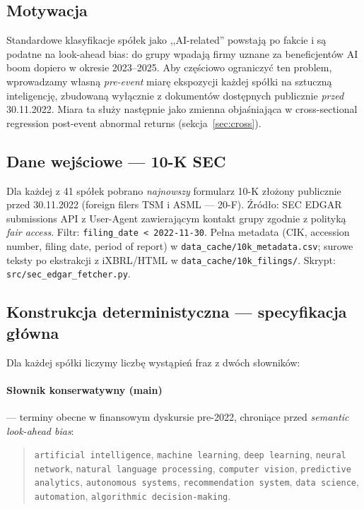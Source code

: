 \documentclass[11pt,a4paper]{article}
\begin{document}
\subsection{Motywacja}
Standardowe klasyfikacje spółek jako ,,AI-related'' powstają po fakcie i są
podatne na look-ahead bias: do grupy wpadają firmy uznane za beneficjentów AI
boom dopiero w okresie 2023--2025. Aby częściowo ograniczyć ten problem,
wprowadzamy własną \emph{pre-event} miarę ekspozycji każdej spółki na sztuczną
inteligencję, zbudowaną wyłącznie z dokumentów dostępnych publicznie
\emph{przed} 30.11.2022. Miara ta służy następnie jako zmienna objaśniająca
w cross-sectional regression post-event abnormal returns
(sekcja~\ref{sec:cross}).

\subsection{Dane wejściowe --- 10-K SEC}
Dla każdej z 41 spółek pobrano \emph{najnowszy} formularz 10-K złożony
publicznie przed 30.11.2022 (foreign filers TSM i ASML --- 20-F). Źródło:
SEC EDGAR submissions API z User-Agent zawierającym kontakt grupy zgodnie
z polityką \emph{fair access}. Filtr: \texttt{filing\_date < 2022-11-30}.
Pełna metadata (CIK, accession number, filing date, period of report)
w \texttt{data\_cache/10k\_metadata.csv}; surowe teksty po ekstrakcji
z iXBRL/HTML w \texttt{data\_cache/10k\_filings/}. Skrypt:
\texttt{src/sec\_edgar\_fetcher.py}.

\subsection{Konstrukcja deterministyczna --- specyfikacja główna}
Dla każdej spółki liczymy liczbę wystąpień fraz z dwóch słowników:

\paragraph{Słownik konserwatywny (main)} --- terminy obecne w finansowym
dyskursie pre-2022, chroniące przed \emph{semantic look-ahead bias}:
\begin{quote}\small
\texttt{artificial intelligence}, \texttt{machine learning}, \texttt{deep learning},
\texttt{neural network}, \texttt{natural language processing}, \texttt{computer vision},
\texttt{predictive analytics}, \texttt{autonomous systems}, \texttt{recommendation system},
\texttt{data science}, \texttt{automation}, \texttt{algorithmic decision-making}.
\end{quote}
\end{document}
